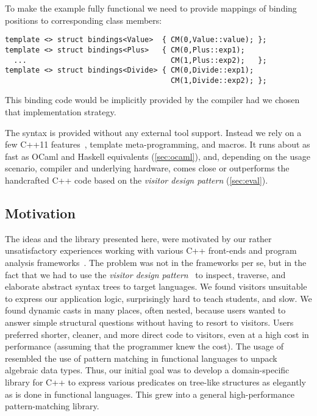 \noindent
To make the example fully functional we need to provide mappings of binding 
positions to corresponding class members:

\begin{lstlisting}[keepspaces,columns=flexible]
template <> struct bindings<Value>  { CM(0,Value::value); };
template <> struct bindings<Plus>   { CM(0,Plus::exp1); 
  ...                                 CM(1,Plus::exp2);   };
template <> struct bindings<Divide> { CM(0,Divide::exp1); 
                                      CM(1,Divide::exp2); };
\end{lstlisting}

\noindent
This binding code would be implicitly provided by the compiler had
we chosen that implementation strategy.

The syntax is provided without any external tool support. Instead we rely on a 
few C++11 features~\cite{C++11}, template meta-programming, and macros. It runs 
about as fast as OCaml and Haskell equivalents (\textsection\ref{sec:ocaml}), and, depending 
on the usage scenario, compiler and underlying hardware, comes close or 
outperforms the handcrafted C++ code based on the \emph{visitor design pattern} 
(\textsection\ref{sec:eval}).

\subsection{Motivation}

The ideas and the library presented here, were motivated by our 
rather unsatisfactory experiences working with various C++ front-ends and 
program analysis frameworks~\cite{Pivot09,Phoenix,Clang,Lise}. 
The problem was not in the frameworks per se, but in the fact that we had to use
the \emph{visitor design pattern}~\cite{DesignPatterns1993} to inspect, traverse, and 
elaborate abstract syntax trees to target languages. We found visitors 
unsuitable to express our application logic, surprisingly hard to teach 
students, and slow. We found dynamic casts in many places, often nested, 
because users wanted to answer simple structural 
questions without having to resort to visitors. Users preferred shorter, cleaner, 
and more direct code to visitors, even at a high cost in performance (assuming 
that the programmer knew the cost). The usage of  resembled 
the use of pattern matching in functional languages to unpack algebraic data 
types. Thus, our initial goal was to develop a domain-specific library for C++ 
to express various predicates on tree-like structures as elegantly as is done in functional 
languages. This grew into a general high-performance pattern-matching library.

